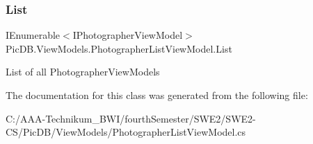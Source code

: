 \subsubsection{\texorpdfstring{List}{List}}
{\footnotesize\ttfamily I\+Enumerable$<$I\+Photographer\+View\+Model$>$ Pic\+D\+B.\+View\+Models.\+Photographer\+List\+View\+Model.\+List\hspace{0.3cm}{\ttfamily [get]}}



List of all Photographer\+View\+Models 



The documentation for this class was generated from the following file\+:\begin{DoxyCompactItemize}
\item 
C\+:/\+A\+A\+A-\/\+Technikum\+\_\+\+B\+W\+I/fourth\+Semester/\+S\+W\+E2/\+S\+W\+E2-\/\+C\+S/\+Pic\+D\+B/\+View\+Models/Photographer\+List\+View\+Model.\+cs\end{DoxyCompactItemize}
